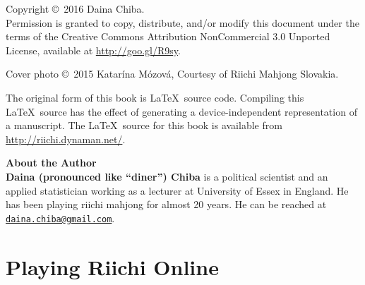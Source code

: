 \documentclass{book}
\begin{document}
\pagebreak

\pagebreak
\thispagestyle{empty}

\noindent
{\small
Copyright \copyright ~2016 Daina Chiba.\\
Permission is granted to copy, distribute, and/or modify this document
under the terms of the Creative Commons Attribution NonCommercial 3.0 Unported License, available at \url{http://goo.gl/R9sy}.

\vspace{.2in}
\noindent
Cover photo \copyright ~2015 Katar\'{i}na M\'{o}zov\'{a}, Courtesy of Riichi Mahjong Slovakia.

\vspace{.2in}

\noindent
The original form of this book is \LaTeX\ source code.  Compiling this
\LaTeX\ source has the effect of generating a device-independent
representation of a manuscript. The \LaTeX\ source for this book is available from
\url{http://riichi.dynaman.net/}.

\vfill
\noindent
{\large\bf About the Author}\\

\noindent
{\bf Daina (pronounced like ``diner'') Chiba} is a political scientist and an applied statistician working as a lecturer at University of Essex in England.
He has been playing riichi mahjong for almost 20 years.
He can be reached at \href{mailto:daina.chiba@gmail.com}{\tt daina.chiba@gmail.com}.
} %


\pagebreak

\let\cleardoublepage\clearpage




{
	\tableofcontents
}

\newpage

\mainmatter


\part{Playing Riichi Online} \label{part:online}



\end{document}
